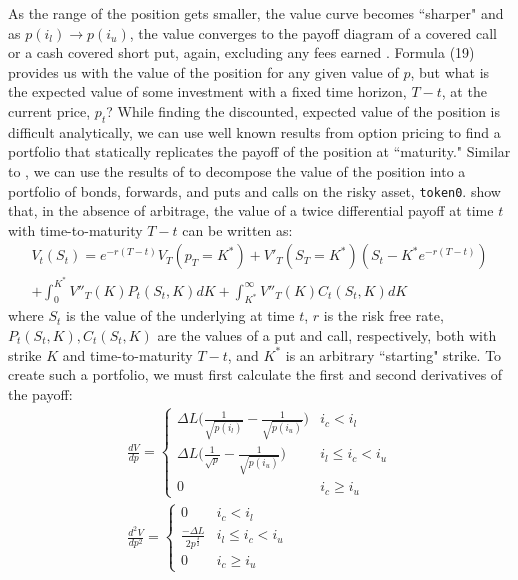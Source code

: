 \documentclass[11pt]{article}
\begin{document}
As the range of the position gets smaller, the value curve becomes ``sharper" and as $p(i_l) \rightarrow p(i_u)$, the value converges to the payoff diagram of a covered call or a cash covered short put, again, excluding any fees earned \citep{LambertMedium1}. Formula (19) provides us with the value of the position for any given value of $p$, but what is the expected value of some investment with a fixed time horizon, $T - t$, at the current price, $p_t$? While finding the discounted, expected value of the position is difficult analytically, we can use well known results from option pricing to find a portfolio that statically replicates the payoff of the position at ``maturity." Similar to \citet{ClarkReplicatingPortfolio}, we can use the results of \citet{Carr98towardsa} to decompose the value of the position into a portfolio of bonds, forwards, and puts and calls on the risky asset, \texttt{token0}. \citet{Carr98towardsa} show that, in the absence of arbitrage, the value of a twice differential payoff at time $t$ with time-to-maturity $T - t$ can be written as:
\begin{gather*}
    V_t(S_t) = e^{-r(T-t)} V_T(p_T = K^*) + V'_T(S_T = K^*)(S_t - K^* e^{-r(T-t)}) \\
    + \int_0^{K^*} V''_T(K) P_t(S_t, K) dK + \int_{K^*}^{\infty} V''_T(K) C_t(S_t, K) dK
\end{gather*}
where $S_t$ is the value of the underlying at time $t$, $r$ is the risk free rate, $P_t(S_t, K), C_t(S_t, K)$ are the values of a put and call, respectively, both with strike $K$ and time-to-maturity $T - t$, and $K^*$ is an arbitrary ``starting" strike. To create such a portfolio, we must first calculate the first and second derivatives of the payoff:
\begin{gather*}
    \frac{dV}{dp} =
    \begin{cases}
        \Delta L \bigg( \frac{1}{\sqrt{p(i_l)}} - \frac{1}{\sqrt{p(i_u)}} \bigg) & i_c < i_l \\
        \Delta L \bigg( \frac{1}{\sqrt{p}} - \frac{1}{\sqrt{p(i_u)}} \bigg) & i_l \le i_c < i_u \\
        0 & i_c \ge i_u
    \end{cases}  \\
    \frac{d^2 V}{dp^2} =
    \begin{cases}
        0 & i_c < i_l \\
        \frac{-\Delta L}{2 p^{\frac{3}{2}}} & i_l \le i_c < i_u \\
        0 & i_c \ge i_u
    \end{cases}
\end{gather*}
\end{document}

